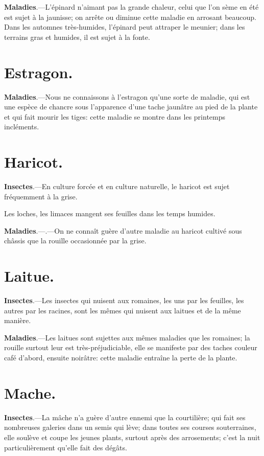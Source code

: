 \documentclass[10pt,a4paper]{book}
\begin{document}
\textbf{Maladies}.---L'épinard n'aimant pas la grande chaleur, celui que l'on sème en été est sujet à la jaunisse; on arrête ou diminue cette maladie en arrosant beaucoup. Dans les automnes très-humides, l'épinard peut attraper le meunier; dans les terrains gras et humides, il est sujet à la fonte.

\section{Estragon.}

\textbf{Maladies}.---Nous ne connaissons à l'estragon qu'une sorte de maladie, qui est une espèce de chancre sous l'apparence d'une tache jaunâtre au pied de la plante et qui fait mourir les tiges: cette maladie se montre dans les printemps incléments.

\section{Haricot.}

\textbf{Insectes}.---En culture forcée et en culture naturelle, le haricot est sujet fréquemment à la grise.

Les loches, les limaces mangent ses feuilles dans les temps humides.

\textbf{Maladies}.---.---On ne connaît guère d'autre maladie au haricot cultivé sous châssis que la rouille occasionnée par la grise.

\section{Laitue.}

\textbf{Insectes}.---Les insectes qui nuisent aux romaines, les uns par les feuilles, les autres par les racines, sont les mêmes qui nuisent aux laitues et de la même manière.

\textbf{Maladies}.---Les laitues sont sujettes aux mêmes maladies que les romaines; la rouille surtout leur est très-préjudiciable, elle se manifeste par des taches couleur café d'abord, ensuite noirâtre: cette maladie entraîne la perte de la plante.

\section{Mache.}

\textbf{Insectes}.---La mâche n'a guère d'autre ennemi que la courtilière; qui fait ses nombreuses galeries dans un semis qui lève; dans toutes ses courses souterraines, elle soulève et coupe les jeunes plants, surtout après des arrosements; c'est la nuit particulièrement qu'elle fait des dégâts.
\end{document}
